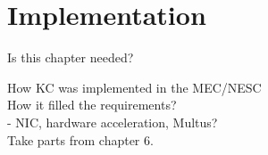 \chapter{Implementation}
\label{chapter:implementation}

Is this chapter needed?

How KC was implemented in the MEC/NESC \\
How it filled the requirements? \\
- NIC, hardware acceleration, Multus? \\

Take parts from chapter 6.